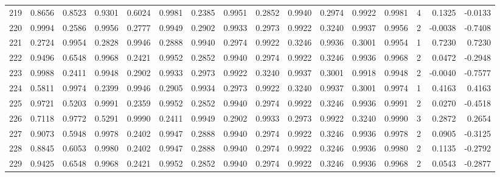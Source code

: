 \begin{tabular}{lrrrrrrrrrrrrrrr}
219 &      0.8656 &  0.8523 &  0.9301 &  0.6024 &  0.9981 &  0.2385 &  0.9951 &  0.2852 &  0.9940 &  0.2974 &   0.9922 &     0.9981 &      4 &                    0.1325 &                    -0.0133 \\
220 &      0.9994 &  0.2586 &  0.9956 &  0.2777 &  0.9949 &  0.2902 &  0.9933 &  0.2973 &  0.9922 &  0.3240 &   0.9937 &     0.9956 &      2 &                   -0.0038 &                    -0.7408 \\
221 &      0.2724 &  0.9954 &  0.2828 &  0.9946 &  0.2888 &  0.9940 &  0.2974 &  0.9922 &  0.3246 &  0.9936 &   0.3001 &     0.9954 &      1 &                    0.7230 &                     0.7230 \\
222 &      0.9496 &  0.6548 &  0.9968 &  0.2421 &  0.9952 &  0.2852 &  0.9940 &  0.2974 &  0.9922 &  0.3246 &   0.9936 &     0.9968 &      2 &                    0.0472 &                    -0.2948 \\
223 &      0.9988 &  0.2411 &  0.9948 &  0.2902 &  0.9933 &  0.2973 &  0.9922 &  0.3240 &  0.9937 &  0.3001 &   0.9918 &     0.9948 &      2 &                   -0.0040 &                    -0.7577 \\
224 &      0.5811 &  0.9974 &  0.2399 &  0.9946 &  0.2905 &  0.9934 &  0.2973 &  0.9922 &  0.3240 &  0.9937 &   0.3001 &     0.9974 &      1 &                    0.4163 &                     0.4163 \\
225 &      0.9721 &  0.5203 &  0.9991 &  0.2359 &  0.9952 &  0.2852 &  0.9940 &  0.2974 &  0.9922 &  0.3246 &   0.9936 &     0.9991 &      2 &                    0.0270 &                    -0.4518 \\
226 &      0.7118 &  0.9772 &  0.5291 &  0.9990 &  0.2411 &  0.9949 &  0.2902 &  0.9933 &  0.2973 &  0.9922 &   0.3240 &     0.9990 &      3 &                    0.2872 &                     0.2654 \\
227 &      0.9073 &  0.5948 &  0.9978 &  0.2402 &  0.9947 &  0.2888 &  0.9940 &  0.2974 &  0.9922 &  0.3246 &   0.9936 &     0.9978 &      2 &                    0.0905 &                    -0.3125 \\
228 &      0.8845 &  0.6053 &  0.9980 &  0.2402 &  0.9947 &  0.2888 &  0.9940 &  0.2974 &  0.9922 &  0.3246 &   0.9936 &     0.9980 &      2 &                    0.1135 &                    -0.2792 \\
229 &      0.9425 &  0.6548 &  0.9968 &  0.2421 &  0.9952 &  0.2852 &  0.9940 &  0.2974 &  0.9922 &  0.3246 &   0.9936 &     0.9968 &      2 &                    0.0543 &                    -0.2877 \\

\end{tabular}

